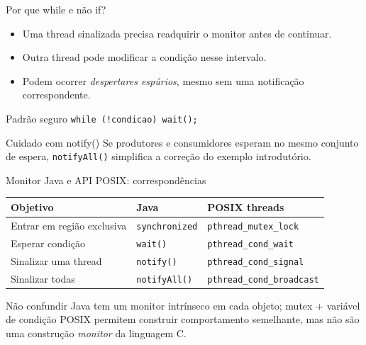 \documentclass[aspectratio=169,11pt]{beamer}
\begin{document}
\begin{frame}{Por que while e não if?}
\small
\begin{itemize}
\item Uma thread sinalizada precisa readquirir o monitor antes de continuar.
\item Outra thread pode modificar a condição nesse intervalo.
\item Podem ocorrer \emph{despertares espúrios}, mesmo sem uma notificação correspondente.
\end{itemize}
\begin{block}{Padrão seguro}
\texttt{while (!condicao) wait();}
\end{block}
\begin{alertblock}{Cuidado com notify()}
Se produtores e consumidores esperam no mesmo conjunto de espera, \texttt{notifyAll()} simplifica a correção do exemplo introdutório.
\end{alertblock}
\end{frame}

\begin{frame}{Monitor Java e API POSIX: correspondências}
\footnotesize
\begin{tabular}{p{3.5cm}p{3.4cm}p{3.2cm}}
\toprule
\textbf{Objetivo} & \textbf{Java} & \textbf{POSIX threads}\\
\midrule
Entrar em região exclusiva & \texttt{synchronized} & \texttt{pthread\_mutex\_lock}\\
Esperar condição & \texttt{wait()} & \texttt{pthread\_cond\_wait}\\
Sinalizar uma thread & \texttt{notify()} & \texttt{pthread\_cond\_signal}\\
Sinalizar todas & \texttt{notifyAll()} & \texttt{pthread\_cond\_broadcast}\\
\bottomrule
\end{tabular}
\vspace{.25cm}
\begin{alertblock}{Não confundir}
Java tem um monitor intrínseco em cada objeto; mutex + variável de condição POSIX permitem construir comportamento semelhante, mas não são uma construção \emph{monitor} da linguagem C.
\end{alertblock}
\end{frame}
\end{document}
